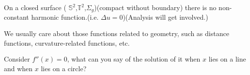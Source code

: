 \begin{example}
    On a closed surface ( $\mathbb{S}^2$,$\mathbb{T}^2$,$\Sigma_g$)(compact without boundary) there is no non-constant harmonic function.(i.e. $\Delta u=0$)(Analysis will get involved.)
\end{example}
We usually care about those functions related to geometry, such as distance functions, curvature-related functions, etc.
\begin{example}
    Consider $f''(x)=0$, what can you say of the solution of it when $x$ lies on a line and when $x$ lies on a circle?
\end{example}
